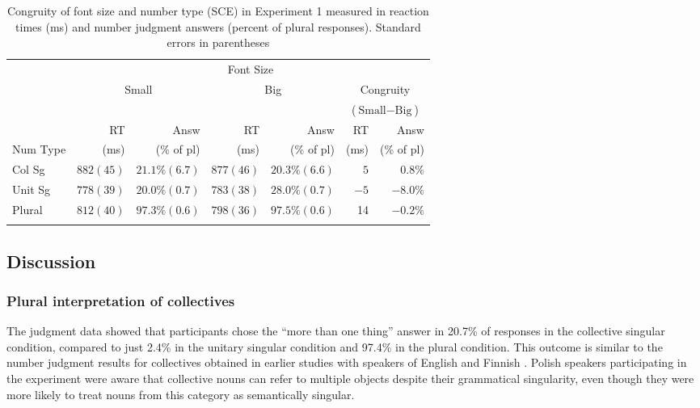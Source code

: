 \documentclass[output=paper]{langscibook}
\begin{document}
\begin{table}[]
\caption{Congruity of font size and number type (SCE) in Experiment 1 measured in reaction times (ms) and number judgment answers (percent of plural responses). Standard errors in parentheses}
\label{gul-bla:tab:SCE-exp1}
\begin{tabularx}{.97\textwidth}{X r@{~~~}r r@{~~~}r r@{~~~}r}
\lsptoprule
&\multicolumn{6}{c}{Font Size}\\\cmidrule(lr){2-7}
&\multicolumn{2}{c}{\multirow{2}{*}{Small}}&\multicolumn{2}{c}{\multirow{2}{*}{Big}}&\multicolumn{2}{c}{Congruity}\\
&&&&&\multicolumn{2}{c}{($\text{Small}-\text{Big}$)}\\\cmidrule(lr){2-3}\cmidrule(lr){4-5}\cmidrule(lr){6-7}
&RT&Answ&RT&Answ&RT&Answ\\
Num Type&(ms)&(\% of pl)&(ms)&(\% of pl)&(ms)&(\% of pl)\\\midrule
Col Sg  & $882 (45)$ & $21.1\% (6.7)$ & $877 (46)$ & $20.3\% (6.6)$ & $5$  & $0.8\%$  \\
Unit Sg & $778 (39)$ & $20.0\% (0.7)$ & $783 (38)$ & $28.0\% (0.7)$ & $-5$ & $-8.0\%$ \\
Plural  & $812 (40)$ & $97.3\% (0.6)$ & $798 (36)$ & $97.5\% (0.6)$ & 14 & $-0.2\%$ \\
\lspbottomrule
\end{tabularx}
\end{table}


\subsection{Discussion}

\subsubsection{Plural interpretation of collectives}
The judgment data showed that participants chose the “more than one thing” answer in 20.7\% of responses in the collective singular condition, compared to just 2.4\% in the unitary singular condition and 97.4\% in the plural condition. This outcome is similar to the number judgment results for collectives obtained in earlier studies with speakers of English \citep{bockMeaningSoundSyntax1993} and Finnish \citep{nenonenMismatchesGrammaticalNumber2010}. Polish speakers participating in the experiment were aware that collective nouns can refer to multiple objects despite their grammatical singularity, even though they were more likely to treat nouns from this category as semantically singular. 
\end{document}
